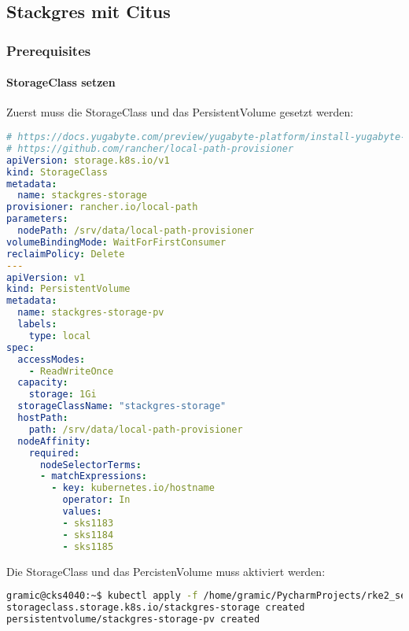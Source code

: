 
\subsection{Stackgres mit Citus}
\label{subsec:evaluation_installation_stackgres}
\subsubsection{Prerequisites}
\paragraph{StorageClass setzen}
Zuerst muss die StorageClass und das PersistentVolume gesetzt werden:
\lstset{style=gra_codestyle}
\begin{lstlisting}[language=yaml, caption=StackGres-Citus - StorageClass setzen,captionpos=b,label={lst:stackgres-citus-storageclass-yaml},breaklines=true]
# https://docs.yugabyte.com/preview/yugabyte-platform/install-yugabyte-platform/prepare-environment/kubernetes/#configure-storage-class
# https://github.com/rancher/local-path-provisioner
apiVersion: storage.k8s.io/v1
kind: StorageClass
metadata:
  name: stackgres-storage
provisioner: rancher.io/local-path
parameters:
  nodePath: /srv/data/local-path-provisioner
volumeBindingMode: WaitForFirstConsumer
reclaimPolicy: Delete
---
apiVersion: v1
kind: PersistentVolume
metadata:
  name: stackgres-storage-pv
  labels:
    type: local
spec:
  accessModes:
    - ReadWriteOnce
  capacity:
    storage: 1Gi
  storageClassName: "stackgres-storage"
  hostPath:
    path: /srv/data/local-path-provisioner
  nodeAffinity:
    required:
      nodeSelectorTerms:
      - matchExpressions:
        - key: kubernetes.io/hostname
          operator: In
          values:
          - sks1183
          - sks1184
          - sks1185
\end{lstlisting}

Die StorageClass und das PercistenVolume muss aktiviert werden:
\lstset{style=gra_codestyle}
\begin{lstlisting}[language=bash, caption=StackGres-Citus - StorageClass / PersistentVolume aktivieren,captionpos=b,label={lst:stackgres_citus-storageclass-apply},breaklines=true]
gramic@cks4040:~$ kubectl apply -f /home/gramic/PycharmProjects/rke2_settings/stackgres_citus/stackgres_citus/storageclass.yaml
storageclass.storage.k8s.io/stackgres-storage created
persistentvolume/stackgres-storage-pv created
\end{lstlisting}
